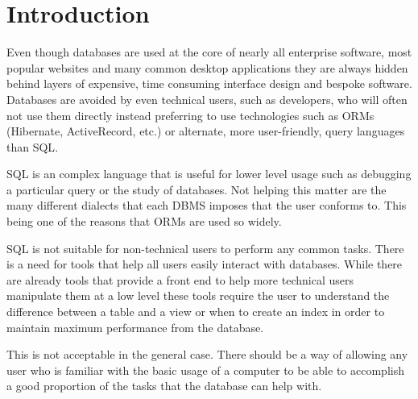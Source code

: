 \chapter{Introduction}

Even though databases are used at the core of nearly all enterprise software, most popular websites and many common desktop applications they are always hidden behind layers of expensive, time consuming interface design and bespoke software. Databases are avoided by even technical users, such as developers, who will often not use them directly instead preferring to use technologies such as \acp{ORM} (Hibernate, ActiveRecord, etc.) or alternate, more user-friendly, query languages than \ac{SQL}.

\ac{SQL} is an complex language that is useful for lower level usage such as debugging a particular query or the study of databases. Not helping this matter are the many different dialects that each \ac{DBMS} imposes that the user conforms to. This being one of the reasons that \acp{ORM} are used so widely.

\ac{SQL} is not suitable for non-technical users to perform any common tasks. There is a need for tools that help all users easily interact with databases. While there are already tools that provide a front end to help more technical users manipulate them at a low level these tools require the user to understand the difference between a table and a view or when to create an index in order to maintain maximum performance from the database.

This is not acceptable in the general case. There should be a way of allowing any user who is familiar with the basic usage of a computer to be able to accomplish a good proportion of the tasks that the database can help with.
